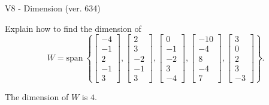 \begin{exercise}
  \begin{exerciseTitle}V8 - Dimension (ver. 634)\end{exerciseTitle}
  \begin{exerciseStatement}
    Explain how to find the dimension of 
\[W=\mathrm{span}\ \left\{\left[\begin{array}{r}
-4 \\
-1 \\
2 \\
-1 \\
3
\end{array}\right] , \left[\begin{array}{r}
2 \\
3 \\
-2 \\
-1 \\
3
\end{array}\right] , \left[\begin{array}{r}
0 \\
-1 \\
-2 \\
3 \\
-4
\end{array}\right] , \left[\begin{array}{r}
-10 \\
-4 \\
8 \\
-4 \\
7
\end{array}\right] , \left[\begin{array}{r}
3 \\
0 \\
2 \\
3 \\
-3
\end{array}\right]\right\}.\]



  \end{exerciseStatement}
  \begin{exerciseAnswer}
   The dimension of \(W\) is  \(4\).
  


  \end{exerciseAnswer}
\end{exercise}